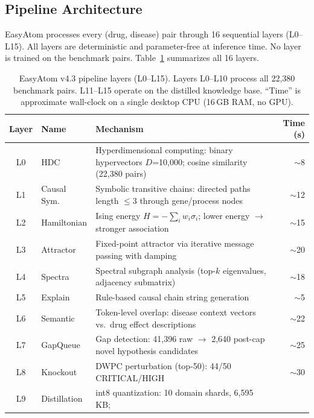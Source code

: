 \documentclass[11pt]{article}
\begin{document}
\subsection{Pipeline Architecture}
\label{sec:pipeline}

EasyAtom processes every (drug, disease) pair through 16 sequential layers (L0--L15).
All layers are deterministic and parameter-free at inference time.
No layer is trained on the benchmark pairs.
Table~\ref{tab:layers} summarizes all 16 layers.

\begin{table}[h]
\centering
\small
\caption{EasyAtom v4.3 pipeline layers (L0--L15). Layers L0--L10 process all
22,380 benchmark pairs. L11--L15 operate on the distilled knowledge base.
``Time'' is approximate wall-clock on a single desktop CPU (16\,GB RAM, no GPU).}
\label{tab:layers}
\begin{tabular}{clp{6.4cm}r}
\toprule
\textbf{Layer} & \textbf{Name} & \textbf{Mechanism} & \textbf{Time (s)} \\
\midrule
L0  & HDC           & Hyperdimensional computing: binary hypervectors
                      $D$=10,000; cosine similarity (22,380 pairs) & $\sim$8 \\
L1  & Causal Sym.   & Symbolic transitive chains: directed paths
                      length $\leq$3 through gene/process nodes & $\sim$12 \\
L2  & Hamiltonian   & Ising energy $H{=}{-}\sum_i w_i\sigma_i$;
                      lower energy $\to$ stronger association & $\sim$15 \\
L3  & Attractor     & Fixed-point attractor via iterative
                      message passing with damping & $\sim$20 \\
L4  & Spectra       & Spectral subgraph analysis
                      (top-$k$ eigenvalues, adjacency submatrix) & $\sim$18 \\
L5  & Explain       & Rule-based causal chain string generation & $\sim$5 \\
L6  & Semantic      & Token-level overlap: disease context vectors
                      vs.\ drug effect descriptions & $\sim$22 \\
L7  & GapQueue      & Gap detection: 41,396 raw $\to$ 2,640 post-cap
                      novel hypothesis candidates & $\sim$25 \\
L8  & Knockout      & DWPC perturbation (top-50): 44/50 CRITICAL/HIGH & $\sim$30 \\
L9  & Distillation  & int8 quantization: 10 domain shards, 6,595\,KB;

\end{tabular}
\end{table}
\end{document}
